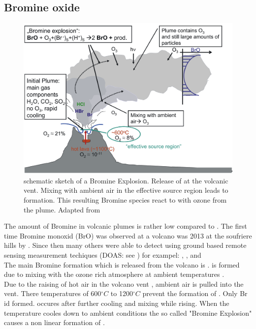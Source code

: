 \documentclass  [
  paper    = a4,
  BCOR     = 10mm,
  twoside,
  fontsize = 12pt,
  fleqn,
  toc      = bibnumbered,
  toc      = listofnumbered,
  numbers  = noendperiod,
  headings = normal,
  listof   = leveldown,
  version  = 3.03
]                                       {scrreprt}
\begin{document}
\subsection{Bromine oxide}
\begin{figure}
	\centering
	\includegraphics[width=0.9\linewidth]{Bilder/Simon/Bilder_Tung/BrO_Plume}
	\caption{schematic sketch of a Bromine Explosion.
		Release of  at the volcanic vent. Mixing with ambient air in the effective source region leads to  formation. This resulting Bromine species react to  with ozone from the plume. Adapted from \cite{bobrowski2007reactive}}
	\label{fig:broplume}
\end{figure}
The amount of Bromine in volcanic plumes is rather low compared to . The first time Bromine monoxid (BrO) was observed at a volcano was 2013 at the soufriere hills by \cite{Bobrowski 2013}. Since then many others were able to detect   using ground based remote sensing measurement techiques (DOAS: see ) for exampel:
\citet{bobrowski2007so2}, \citet{bobrowski2007reactive},\citet{vogel2011volcanic} and \cite{lubcke2014bro}
\\
The main Bromine formation which is released from the volcano is  .   is formed due to mixing with the ozone rich atmosphere at ambient temperatures \cite{bobrowski2007reactive}.\\
Due to the raising of hot air in the volcano vent , ambient air is pulled into the vent. There temperatures of  600$^{\circ}C$ to 1200$^{\circ}C$    prevent the formation of . Only Br id formed.   occures after further cooling and mixing while rising. When the temperature cooles down to ambient conditions the so called "Bromine Explosion" causes a non linear formation of .
\end{document}
